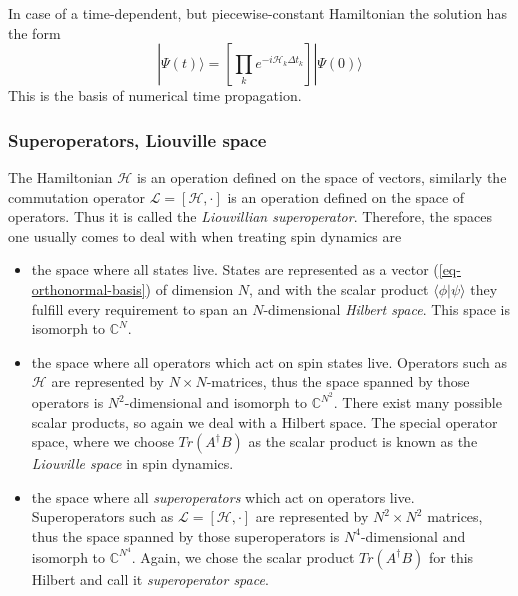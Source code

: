 \documentclass[11.5pt,a4paper]{article}
\begin{document}
In case of a time-dependent, but piecewise-constant Hamiltonian the solution has the form
\begin{equation}
 |\Psi(t)\rangle = \left[ \prod_k e^{-i\mathcal{H}_k \Delta t_k} \right] |\Psi(0)\rangle
\end{equation}
This is the basis of numerical time propagation.

\subsubsection{Superoperators, Liouville space}
The Hamiltonian $\mathcal{H}$ is an operation defined on the space of vectors, similarly the commutation operator $\mathcal{L} = [\mathcal{H}, \cdot ]$ is an operation defined on the space of operators. Thus it is called the \emph{Liouvillian superoperator}. Therefore, the spaces one usually comes to deal with when treating spin dynamics are

\begin{itemize}
 \item the space where all states live. States are represented as a vector (\ref{eq-orthonormal-basis}) of dimension $N$, and with the scalar product $\langle \phi | \psi \rangle$ they fulfill every requirement to span an $N$-dimensional \emph{Hilbert space}. This space is isomorph to $\mathbb{C}^N$.
  \item the space where all operators which act on spin states live. Operators such as $\mathcal{H}$ are represented by $N\times N$-matrices, thus the space spanned by those operators is $N^2$-dimensional and isomorph to $\mathbb{C}^{N^2}$. There exist many possible scalar products, so again we deal with a Hilbert space. The special operator space, where we choose $Tr(A^\dagger B)$ as the scalar product is known as the \emph{Liouville space} in spin dynamics.
  \item the space where all \emph{superoperators} which act on operators live. Superoperators such as $\mathcal{L} = [\mathcal{H}, \cdot ]$ are represented by $N^2 \times N^2$ matrices, thus the space spanned by those superoperators is $N^4$-dimensional and isomorph to $\mathbb{C}^{N^4}$. Again, we chose the scalar product $Tr(A^\dagger B)$ for this Hilbert and call it \emph{superoperator space}.
\end{itemize}
\end{document}
